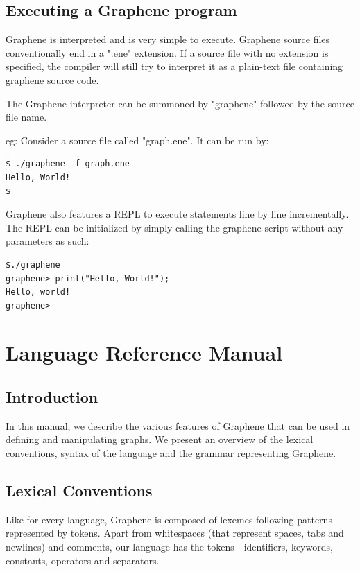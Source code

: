 \documentclass[a4paper]{article}
\begin{document}
\subsection{Executing a Graphene program}

Graphene is interpreted and is very simple to execute. Graphene source files conventionally end in a ".ene" extension. If a source file with no extension is specified, the compiler will still try to interpret it as a plain-text file containing graphene source code.

The Graphene interpreter can be summoned by "graphene" followed by the source file name.

eg: Consider a source file called "graph.ene". It can be run by:

\begin{verbatim}
$ ./graphene -f graph.ene
Hello, World!
$
\end{verbatim}

Graphene also features a REPL to execute statements line by line incrementally. The REPL can be initialized by simply calling the graphene script without any parameters as such:

\begin{verbatim}
$./graphene
graphene> print("Hello, World!");
Hello, world!
graphene> 
\end{verbatim}

\newpage
\section{Language Reference Manual}
\subsection{Introduction}

	In this manual, we describe the various features of Graphene that can be used in defining and manipulating graphs. We present an overview of the lexical conventions, syntax of the language and the grammar representing Graphene.

\subsection{Lexical Conventions}

Like for every language, Graphene is composed of lexemes following patterns represented by tokens. Apart from whitespaces (that represent spaces, tabs and newlines) and comments, our language has the tokens - identifiers, keywords, constants, operators and separators.
\end{document}
